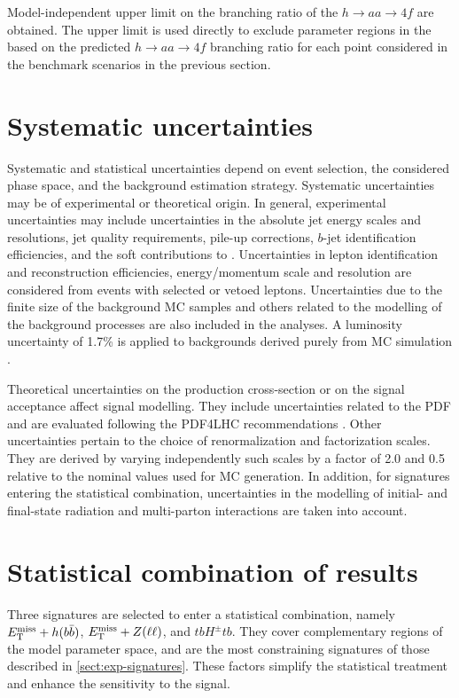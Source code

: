 Model-independent upper limit on the branching ratio of the $h\rightarrow aa \rightarrow 4f$ are obtained. The upper limit is used directly to exclude parameter regions in the \thdma based on the predicted $h\rightarrow aa \rightarrow 4f$ branching ratio for each point considered in the benchmark scenarios in the previous section. 


\section{Systematic uncertainties}
\label{sect:systematic-uncertainties}

Systematic and statistical uncertainties depend on event selection, the considered phase space, and the background estimation strategy. Systematic uncertainties may be of experimental or theoretical origin. In general, experimental uncertainties may include uncertainties in the absolute jet energy scales and resolutions, jet quality requirements, pile-up corrections, $b$-jet identification efficiencies, and the soft contributions to \met. Uncertainties in lepton identification and reconstruction efficiencies, energy/momentum scale and resolution are considered from events with selected or vetoed leptons. Uncertainties due to the finite size of the background MC samples and others related to the modelling of the background processes are also included in the analyses. A luminosity uncertainty of 1.7\% is applied to backgrounds derived purely from MC simulation \cite{ATLAS-CONF-2019-021}. 

Theoretical uncertainties on the production cross-section or on the signal acceptance affect signal modelling. They include uncertainties related to the PDF and are evaluated following the PDF4LHC recommendations \cite{Butterworth:2015oua}. Other uncertainties pertain to the choice of renormalization and factorization scales. They are derived by varying independently such scales by a factor of 2.0 and 0.5 relative to the nominal values used for MC generation. In addition, for signatures entering the statistical combination, uncertainties in the modelling of initial- and final-state radiation and multi-parton interactions are taken into account. 

\section{Statistical combination of results}
\label{sect:stat}
Three \thdma signatures are selected to enter a statistical combination, namely $E_{\mathrm{T}}^{\mathrm{miss}}+h(b\bar{b})$, $E_{\mathrm{T}}^{\mathrm{miss}}+Z(\ell\ell)$, and $tbH^{\pm}tb$. They cover complementary regions of the model parameter space, and are the most constraining signatures of those described in \ref{sect:exp-signatures}. These factors simplify the statistical treatment and enhance the sensitivity to the \thdma signal.

